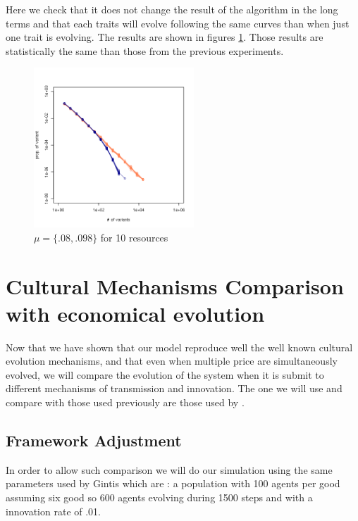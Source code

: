 \documentclass[a4paper]{article}
\begin{document}
Here we check that it does not change the result of the algorithm in the long terms and that each traits will evolve following the same curves than when just one trait is evolving. The results are shown in figures \ref{fig:10resources}. Those results are statistically the same than those from the previous experiments.

\begin{figure}[h]
	\begin{center}
		\includegraphics[width=6cm]{img/10resources.png}
	\end{center}
	\caption{$\mu=\{.08,.098\}$ for 10 resources}
	\label{fig:10resources}
\end{figure}




\section{Cultural Mechanisms Comparison with economical evolution}

Now that we have shown that our model reproduce well the well known cultural evolution mechanisms, and that even when multiple price are simultaneously evolved, we will compare the evolution of the system when it is submit to different mechanisms of transmission and innovation. The one we will use and compare with those used previously are those used by \cite{gintis2006theemergenceofapricesystemfromdecentralizedbilateralexchange}.

\subsection{Framework Adjustment}
In order to allow such comparison we will do our simulation using the same parameters used by Gintis which are : a population with 100 agents per good assuming six good so 600 agents evolving during 1500 steps and with a innovation rate of .01.
\end{document}
